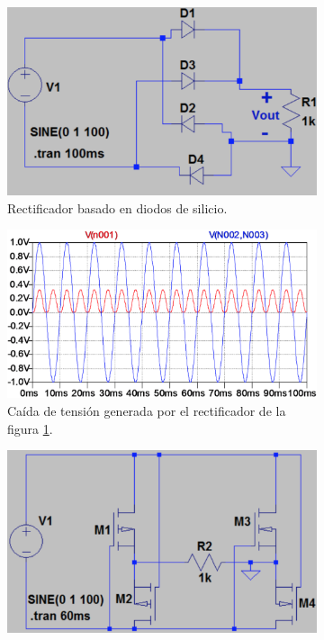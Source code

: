 \begin{figure}[h!]
	\begin{subfigure}{.5\textwidth}
		\centering
		\includegraphics[width=.8\linewidth]{Figures/YILMAZ_silicon_diode_rectifier}  
		\caption{Rectificador basado en diodos de silicio.}
		\label{fig:rect_diodos}
	\end{subfigure}
	\begin{subfigure}{.5\textwidth}
		\centering
		\includegraphics[width=.8\linewidth]{Figures/onda_silicon_rectifier}  
		\caption{Caída de tensión generada por el rectificador de la figura \ref{fig:rect_diodos}.}
		\label{fig:onda_rectificador_diodos}
	\end{subfigure}
	\newline
	\begin{subfigure}{.5\textwidth}
		\centering
		\includegraphics[width=.8\linewidth]{Figures/YILMAZ_passive_MOSFET_rectifier}  

\end{subfigure}
\end{figure}
